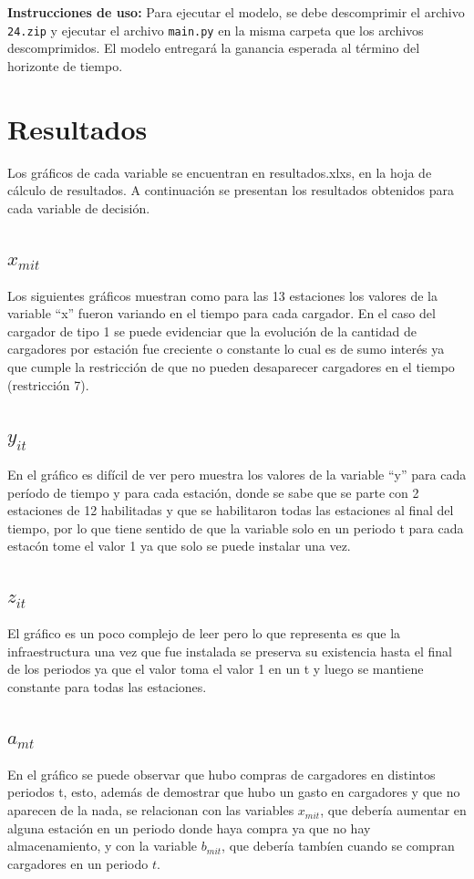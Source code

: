 \documentclass[letterpaper]{article}
\begin{document}
\begin{flushleft}
	\textbf{Instrucciones de uso:} Para ejecutar el modelo, se debe descomprimir el archivo \texttt{24.zip} y ejecutar el archivo \texttt{main.py} en la misma carpeta que los archivos descomprimidos. El modelo entregará la ganancia esperada al término del horizonte de tiempo.

	\section{Resultados}
	Los gráficos de cada variable se encuentran en resultados.xlxs, en la hoja de cálculo de resultados. A continuación se presentan los resultados obtenidos para cada variable de decisión.
	\subsection{$x_{mit}$}
	Los siguientes gráficos muestran como para las 13 estaciones los valores de la variable “x” fueron variando en el tiempo para cada cargador. En el caso del cargador de tipo 1 se puede evidenciar que la evolución de la cantidad de cargadores por estación fue creciente o constante lo cual es de sumo interés ya que cumple la restricción de que no pueden desaparecer cargadores en el tiempo (restricción 7).
	\subsection{$y_{it}$}
	En el gráfico es difícil de ver pero muestra los valores de la variable “y” para cada período de tiempo y para cada estación, donde se sabe que se parte con 2 estaciones de 12 habilitadas y que se habilitaron todas las estaciones al final del tiempo, por lo que tiene sentido de que la variable solo en un periodo t para cada estacón tome el valor 1 ya que solo se puede instalar una vez.
	\subsection{$z_{it}$}
	El gráfico es un poco complejo de leer pero lo que representa es que la infraestructura una vez que fue instalada se preserva su existencia hasta el final de los periodos ya que el valor toma el valor 1 en un t y luego se mantiene constante para todas las estaciones.
	\subsection{$a_{mt}$}
	En el gráfico se puede observar que hubo compras de cargadores en distintos periodos t, esto, además de demostrar que hubo un gasto en cargadores y que no aparecen de la nada, se relacionan con las variables $x_{mit}$, que debería aumentar en alguna estación en un periodo donde haya compra ya que no hay almacenamiento, y con la variable $b_{mit}$, que debería tambíen cuando se compran cargadores en un periodo $t$.

\end{flushleft}
\end{document}
